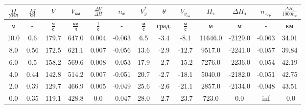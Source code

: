 \begin{tabular}{|c|c|c|c|c|c|c|c|c|c|c|c|c|}
\hline
$\underset{узел}{H}$ & $\underset{сн}{M}$ & $V$ & $V_{км}$ & $\frac{\Delta V}{\Delta H}$ & $n_x$ & $V_{y}^*$ & $\theta$ & $V_{y_{сн}}$ & $H_э$ & $\Delta H_э$ & $n_{x_{ср}}$ & $\frac{\Delta H_{э}}{1000 n_x}$ \\ 
\hline
м & - & $\frac{м}{с}$ & $\frac{км}{ч}$ & $\frac{1}{с}$ & - & $\frac{м}{с}$ & $град.$ & $\frac{м}{с}$ & м & м & - & км \\ 
\hline
10.0 & 0.6 & 179.7 & 647.0 & 0.004 & -0.063 & 6.5 & -3.4 & -8.1 & 11646.0 & -2129.0 & -0.063 & 34.01 \\ 
\hline
8.0 & 0.56 & 172.5 & 621.1 & 0.007 & -0.056 & 13.6 & -2.9 & -12.7 & 9517.0 & -2241.0 & -0.057 & 39.84 \\ 
\hline
6.0 & 0.5 & 158.2 & 569.6 & 0.008 & -0.053 & 17.9 & -2.7 & -15.2 & 7276.0 & -2236.0 & -0.054 & 42.19 \\ 
\hline
4.0 & 0.44 & 142.8 & 514.2 & 0.007 & -0.051 & 20.7 & -2.7 & -18.1 & 5040.0 & -2182.0 & -0.051 & 42.75 \\ 
\hline
2.0 & 0.39 & 129.7 & 466.9 & 0.005 & -0.049 & 25.6 & -2.6 & -21.1 & 2857.0 & -2134.0 & -0.048 & 43.51 \\ 
\hline
0.0 & 0.35 & 119.1 & 428.8 & 0.0 & -0.047 & 28.0 & -2.7 & -23.7 & 723.0 & 0.0 & inf & -0.0 \\ 
\hline
\end{tabular}